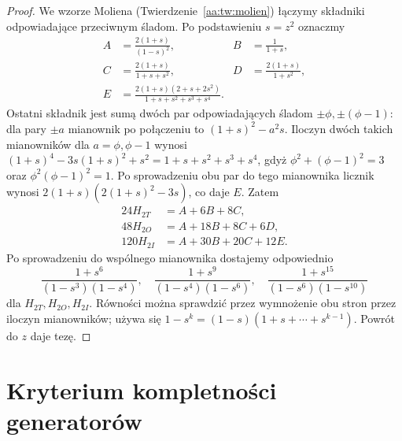 \begin{proof}
We wzorze Moliena
(Twierdzenie~\ref{aa:tw:molien}) łączymy składniki
odpowiadające przeciwnym śladom. Po podstawieniu
$s=z^2$ oznaczmy
\[
\begin{aligned}
 A&=\frac{2(1+s)}{(1-s)^2},&
 B&=\frac1{1+s},\\
 C&=\frac{2(1+s)}{1+s+s^2},&
 D&=\frac{2(1+s)}{1+s^2},\\
 E&=\frac{2(1+s)(2+s+2s^2)}
 {1+s+s^2+s^3+s^4}.
\end{aligned}
\]
Ostatni składnik jest sumą dwóch par odpowiadających
śladom $\pm\phi,\pm(\phi-1)$:
dla pary $\pm a$ mianownik po połączeniu to
$(1+s)^2-a^2s$. Iloczyn dwóch takich mianowników
dla $a=\phi,\phi-1$ wynosi
$(1+s)^4-3s(1+s)^2+s^2=1+s+s^2+s^3+s^4$,
gdyż $\phi^2+(\phi-1)^2=3$ oraz
$\phi^2(\phi-1)^2=1$.
Po sprowadzeniu obu par do tego mianownika licznik
wynosi $2(1+s)(2(1+s)^2-3s)$, co daje $E$.
Zatem
\[
\begin{aligned}
24H_{2T}&=A+6B+8C,\\
48H_{2O}&=A+18B+8C+6D,\\
120H_{2I}&=A+30B+20C+12E.
\end{aligned}
\]
Po sprowadzeniu do wspólnego mianownika dostajemy
odpowiednio
\[
 \frac{1+s^6}{(1-s^3)(1-s^4)},\quad
 \frac{1+s^9}{(1-s^4)(1-s^6)},\quad
 \frac{1+s^{15}}{(1-s^6)(1-s^{10})}
\]
dla $H_{2T},H_{2O},H_{2I}$. Równości można sprawdzić
przez wymnożenie obu stron przez iloczyn mianowników;
używa się $1-s^k=(1-s)(1+s+\cdots+s^{k-1})$.
Powrót do $z$ daje tezę.
\end{proof}

\section{Kryterium kompletności generatorów}

